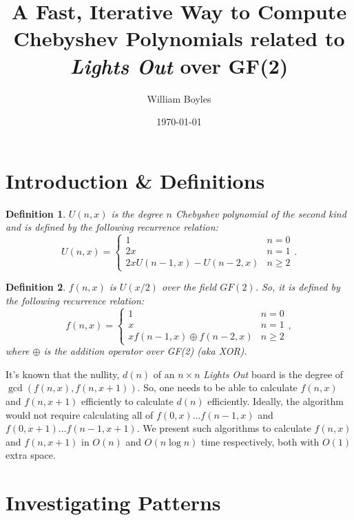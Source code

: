 \documentclass{article}
\newtheorem{definition}{Definition}
\newcommand{\xor}{\oplus}
\begin{document}
	\title{A Fast, Iterative Way to Compute Chebyshev Polynomials related to \textit{Lights Out} over GF(2)}
	\author{William Boyles}
	\date{\today}
	\maketitle
	
	\section{Introduction \& Definitions}
	\begin{definition}
		$U(n,x)$ is the degree $n$ Chebyshev polynomial of the second kind and is defined by the following recurrence relation:
		\begin{equation*}
			U(n,x) = \begin{cases}
				1 & n = 0 \\
				2x & n = 1 \\
				2x U(n-1,x) - U(n-2,x) & n \geq 2
			\end{cases}.
		\end{equation*}
	\end{definition}
	\begin{definition}
		$f(n,x)$ is $U(x/2)$ over the field $GF(2)$.
		So, it is defined by the following recurrence relation:
		\begin{equation*}
			f(n,x) = \begin{cases}
				1 & n = 0 \\
				x & n = 1 \\
				x f(n-1,x) \xor f(n-2,x) & n \geq 2
			\end{cases},
		\end{equation*}
		where $\xor$ is the addition operator over GF(2) (aka XOR).
	\end{definition}
	It's known that the nullity, $d(n)$ of an $n \times n$ \textit{Lights Out} board is the degree of $\gcd(f(n,x), f(n,x+1))$.
	So, one needs to be able to calculate $f(n,x)$ and $f(n,x+1)$ efficiently to calculate $d(n)$ efficiently.
	Ideally, the algorithm would not require calculating all of $f(0,x) \dots f(n-1,x)$ and $f(0,x+1) \dots f(n-1,x+1)$.
	We present such algorithms to calculate $f(n,x)$ and $f(n,x+1)$ in $O(n)$ and $O(n\log{n})$ time respectively, both with $O(1)$ extra space.
	
	\section{Investigating Patterns}
\end{document}
